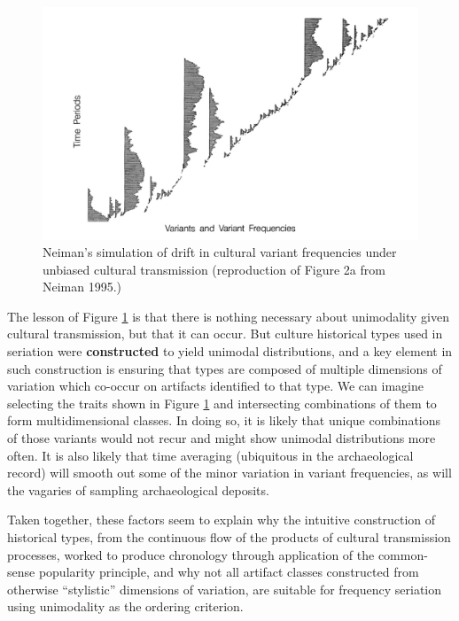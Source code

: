 \documentclass[graybox,natbib]{svmult}
\begin{document}
\begin{figure}[ht]
\centering
\includegraphics[scale=0.6]{neiman-1995-figure2a.pdf}
\caption{Neiman's simulation of drift in cultural variant frequencies under unbiased cultural transmission (reproduction of Figure 2a from Neiman 1995.)}
\label{img:neiman-fig2}
\end{figure}

The lesson of Figure \ref{img:neiman-fig2} is that there is nothing
necessary about unimodality given cultural transmission, but that it can
occur. But culture historical types used in seriation were
\textbf{constructed} to yield unimodal distributions, and a key element
in such construction is ensuring that types are composed of multiple
dimensions of variation which co-occur on artifacts identified to that
type. We can imagine selecting the traits shown in Figure
\ref{img:neiman-fig2} and intersecting combinations of them to form
multidimensional classes. In doing so, it is likely that unique
combinations of those variants would not recur and might show unimodal
distributions more often. It is also likely that time averaging
(ubiquitous in the archaeological record) will smooth out some of the
minor variation in variant frequencies, as will the vagaries of sampling
archaeological deposits.

Taken together, these factors seem to explain why the intuitive
construction of historical types, from the continuous flow of the
products of cultural transmission processes, worked to produce
chronology through application of the common-sense popularity principle,
and why not all artifact classes constructed from otherwise
``stylistic'' dimensions of variation, are suitable for frequency
seriation using unimodality as the ordering criterion.
\end{document}
